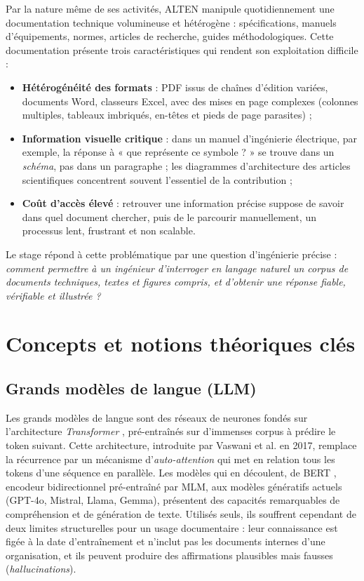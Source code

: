 Par la nature même de ses activités, ALTEN manipule quotidiennement une documentation
technique volumineuse et hétérogène : spécifications, manuels d'équipements, normes,
articles de recherche, guides méthodologiques. Cette documentation présente trois
caractéristiques qui rendent son exploitation difficile :

\begin{itemize}
  \item \textbf{Hétérogénéité des formats} : PDF issus de chaînes d'édition variées,
        documents Word, classeurs Excel, avec des mises en page complexes (colonnes
        multiples, tableaux imbriqués, en-têtes et pieds de page parasites) ;
  \item \textbf{Information visuelle critique} : dans un manuel d'ingénierie électrique,
        par exemple, la réponse à « que représente ce symbole ? » se trouve dans un
        \emph{schéma}, pas dans un paragraphe ; les diagrammes d'architecture des articles
        scientifiques concentrent souvent l'essentiel de la contribution ;
  \item \textbf{Coût d'accès élevé} : retrouver une information précise suppose de savoir
        dans quel document chercher, puis de le parcourir manuellement, un processus lent,
        frustrant et non scalable.
\end{itemize}

Le stage répond à cette problématique par une question d'ingénierie précise :
\emph{comment permettre à un ingénieur d'interroger en langage naturel un corpus de
documents techniques, textes et figures compris, et d'obtenir une réponse fiable,
vérifiable et illustrée ?}

\section{Concepts et notions théoriques clés}
\label{sec:concepts}

\subsection{Grands modèles de langue (LLM)}

Les grands modèles de langue sont des réseaux de neurones fondés sur l'architecture
\emph{Transformer} \cite{vaswani2017attention}, pré-entraînés sur d'immenses corpus à
prédire le token suivant. Cette architecture, introduite par Vaswani et al. en 2017,
remplace la récurrence par un mécanisme d'\emph{auto-attention} qui met en relation tous
les tokens d'une séquence en parallèle. Les modèles qui en découlent, de BERT
\cite{devlin2019bert}, encodeur bidirectionnel pré-entraîné par MLM, aux modèles génératifs
actuels (GPT-4o, Mistral, Llama, Gemma), présentent des capacités remarquables de
compréhension et de génération de texte. Utilisés seuls, ils souffrent cependant de deux
limites structurelles pour un usage documentaire : leur connaissance est figée à la date
d'entraînement et n'inclut pas les documents internes d'une organisation, et ils peuvent
produire des affirmations plausibles mais fausses (\emph{hallucinations}).

